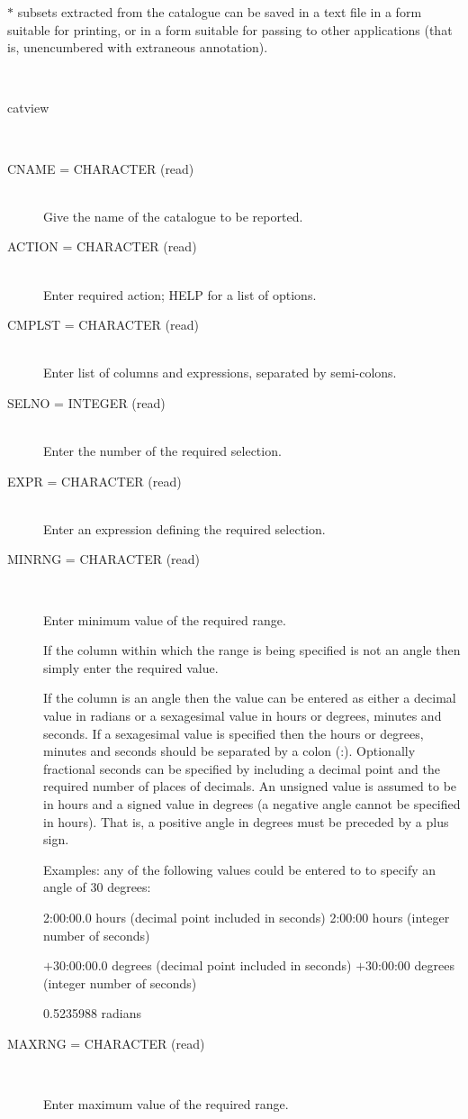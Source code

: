 \documentclass[twoside,11pt]{article}
\renewcommand{\_}{\texttt{\symbol{95}}}
\newcommand{\sstusage}[1]{\item[Usage:] \mbox{}
\\[1.3ex]{\raggedright \ssttt #1}}
\newcommand{\sstparameters}[1]{
   \item[Parameters:] \mbox{} \\
   \vspace{-3.5ex}
   \begin{description}
      #1
   \end{description}
}
\newcommand{\sstsubsection}[1]{ \item[{#1}] \mbox{} \\}
\newcommand{\sstusage}[1]{\item[Usage:]
      \begin{description}
         {\ssttt #1}
      \end{description}
      \\
   }
\newcommand{\sstparameters}[1]{
      \item[Parameters:] \\
      \begin{description}
         #1
      \end{description}
      \\
   }
\newcommand{\sstsubsection}[1]{\item[{#1}]}
\begin{document}
\begin{htmlonly}
{{      $*$ subsets extracted from the catalogue can be saved in a text file
        in a form suitable for printing, or in a form suitable for passing
        to other applications (that is, unencumbered with extraneous
        annotation).
   }
   \sstusage{
      catview
   }
   \sstparameters{
      \sstsubsection{
         CNAME  =  CHARACTER (read)
      }{
         Give the name of the catalogue to be reported.
      }
      \sstsubsection{
         ACTION  =  CHARACTER (read)
      }{
         Enter required action; HELP for a list of options.
      }
      \sstsubsection{
         CMPLST  =  CHARACTER (read)
      }{
         Enter list of columns and expressions, separated by semi-colons.
      }
      \sstsubsection{
         SELNO  =  INTEGER (read)
      }{
         Enter the number of the required selection.
      }
      \sstsubsection{
         EXPR  =  CHARACTER (read)
      }{
         Enter an expression defining the required selection.
      }
      \sstsubsection{
         MINRNG  =  CHARACTER (read)
      }{
         Enter minimum value of the required range.

         If the column within which the range is being specified is
         not an angle then simply enter the required value.

         If the column is an angle then the value can be entered as
         either a decimal value in radians or a sexagesimal value in
         hours or degrees, minutes and seconds.  If a sexagesimal value
         is specified then the hours or degrees, minutes and seconds
         should be separated by a colon (:).  Optionally fractional
         seconds can be specified by including a decimal point and the
         required number of places of decimals.  An unsigned value is
         assumed to be in hours and a signed value in degrees (a
         negative angle cannot be specified in hours).  That is,
         a positive angle in degrees must be preceded by a plus sign.

         Examples: any of the following values could be entered to
         to specify an angle of 30 degrees:

             2:00:00.0   hours (decimal point included in seconds)
             2:00:00     hours (integer number of seconds)

           $+$30:00:00.0   degrees (decimal point included in seconds)
           $+$30:00:00     degrees (integer number of seconds)

             0.5235988   radians
      }
      \sstsubsection{
         MAXRNG  =  CHARACTER (read)
      }{
         Enter maximum value of the required range.

}}}
\end{htmlonly}
\end{document}
